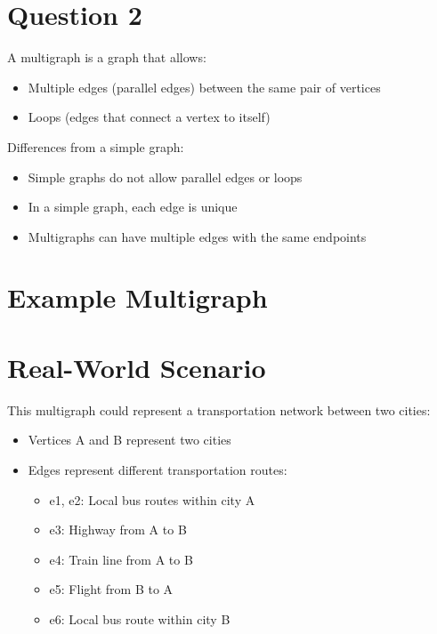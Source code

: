 \documentclass{article}
\begin{document}
\section*{Question 2}

A multigraph is a graph that allows:
\begin{itemize}
    \item Multiple edges (parallel edges) between the same pair of vertices
    \item Loops (edges that connect a vertex to itself)
\end{itemize}

Differences from a simple graph:
\begin{itemize}
    \item Simple graphs do not allow parallel edges or loops
    \item In a simple graph, each edge is unique
    \item Multigraphs can have multiple edges with the same endpoints
\end{itemize}

\section*{Example Multigraph}


\section*{Real-World Scenario}

This multigraph could represent a transportation network between two cities:

\begin{itemize}
    \item Vertices A and B represent two cities
    \item Edges represent different transportation routes:
    \begin{itemize}
        \item e1, e2: Local bus routes within city A
        \item e3: Highway from A to B
        \item e4: Train line from A to B
        \item e5: Flight from B to A
        \item e6: Local bus route within city B
    \end{itemize}
\end{itemize}
\end{document}
